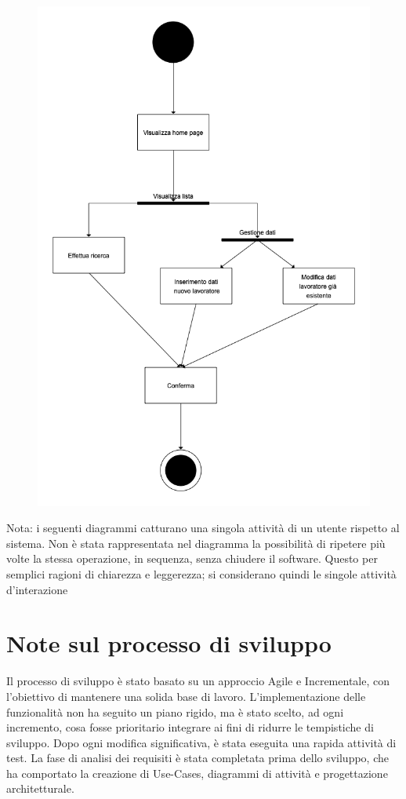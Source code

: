 \documentclass[a4paper, oneside, 12pt]{book}
\begin{document}
\begin{figure}[H]
	\centering
	\includegraphics[width = 10 cm]{images/attivitadipendenti.png}
	\label{fig:attività dipendenti}
\end{figure}

Nota: i seguenti diagrammi catturano una singola attività di un utente rispetto al sistema. Non è stata rappresentata nel diagramma la possibilità di ripetere più volte la stessa operazione, in sequenza, senza chiudere il software. Questo per semplici ragioni di chiarezza e leggerezza; si considerano quindi le singole attività d’interazione

\newpage

\section{Note sul processo di sviluppo}
Il processo di sviluppo è stato basato su un approccio Agile e Incrementale, con l'obiettivo di mantenere una solida base di lavoro. 
L'implementazione delle funzionalità non ha seguito un piano rigido, ma è stato scelto, ad ogni incremento, cosa fosse prioritario integrare
ai fini di ridurre le tempistiche di sviluppo. Dopo ogni modifica significativa, è stata eseguita una rapida attività di test. La fase di analisi 
dei requisiti è stata completata prima dello sviluppo, che ha comportato la creazione di Use-Cases, diagrammi di attività e progettazione architetturale.
\end{document}
